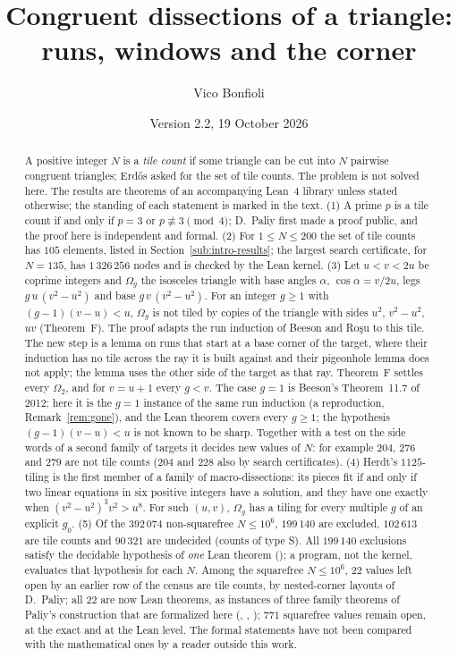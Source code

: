 \documentclass[11pt,reqno]{amsart}
\title[Runs, windows and the corner]{Congruent dissections of a triangle:\\ runs, windows and the corner}
\author{Vico Bonfioli}
\date{Version 2.2, 19 October 2026}
\theoremstyle{plain}
\theoremstyle{definition}
\newcommand{\sS}{\textup{\textsf{S}}}
\begin{document}
\begin{abstract}
A positive integer $N$ is a \emph{tile count} if some triangle can be cut into $N$ pairwise congruent triangles;
Erd\H{o}s asked for the set of tile counts. The problem is not solved here. The results are theorems of an accompanying
Lean~4 library unless stated otherwise; the standing of each statement is marked in the text.
\textup{(1)} A prime $p$ is a tile count if and only if $p=3$ or $p\not\equiv3\pmod4$; D.~Paliy first made a proof public, and the proof here is independent and formal.
\textup{(2)} For $1\le N\le200$ the set of tile counts has $105$ elements, listed in Section~\ref{sub:intro-results}; the largest search certificate, for $N=135$,
has $1\,326\,256$ nodes and is checked by the Lean kernel.
\textup{(3)} Let $u<v<2u$ be coprime integers and $\Omega_{g}$ the isosceles triangle with base angles $\alpha$, $\cos\alpha=v/2u$, legs $g\,u\,(v^2-u^2)$ and base $g\,v\,(v^2-u^2)$.
For an integer $g\ge1$ with $(g-1)(v-u)<u$, $\Omega_{g}$ is not tiled by copies of the triangle with sides $u^2$, $v^2-u^2$, $uv$ (Theorem~F).
The proof adapts the run induction of Beeson and Ro\c{s}u to this tile. The new step is a lemma on runs that start at a base corner of the target, where their induction has no tile across the ray it is built against and their pigeonhole lemma does not apply; the lemma uses the other side of the target as that ray.
Theorem~F settles every $\Omega_{2}$, and for $v=u+1$ every $g<v$. The case $g=1$ is Beeson's Theorem~11.7 of 2012; here it is the $g=1$ instance of the same run induction (a reproduction, Remark~\ref{rem:gone}), and the Lean theorem covers every $g\ge1$; the hypothesis $(g-1)(v-u)<u$ is not known to be sharp. Together with a test on the side words of a second family of targets it decides new values of $N$: for example $204$, $276$ and $279$ are not tile counts ($204$ and $228$ also by search certificates).
\textup{(4)} Herdt's $1125$-tiling is the first member of a family of macro-dissections: its pieces fit if and only if two linear equations in six positive integers
have a solution, and they have one exactly when $(v^2-u^2)^3v^2>u^8$. For such $(u,v)$, $\Omega_{g}$ has a tiling for every multiple $g$ of an explicit $g_0$.
\textup{(5)} Of the $392\,074$ non-squarefree $N\le10^6$, $199\,140$ are excluded, $102\,613$ are tile counts and $90\,321$ are undecided (counts of type \sS). All $199\,140$ exclusions satisfy the decidable hypothesis of \emph{one} Lean theorem (); a program, not the kernel, evaluates that hypothesis for each $N$. Among the squarefree $N\le10^6$, $22$ values left open by an earlier row of the census are tile counts, by nested-corner layouts of D.~Paliy; all $22$ are now Lean theorems, as instances of three family theorems of Paliy's construction that are formalized here (, , ); $771$ squarefree values remain open, at the exact and at the Lean level.
The formal statements have not been compared with the mathematical ones by a reader outside this work.
\end{abstract}
\end{document}
